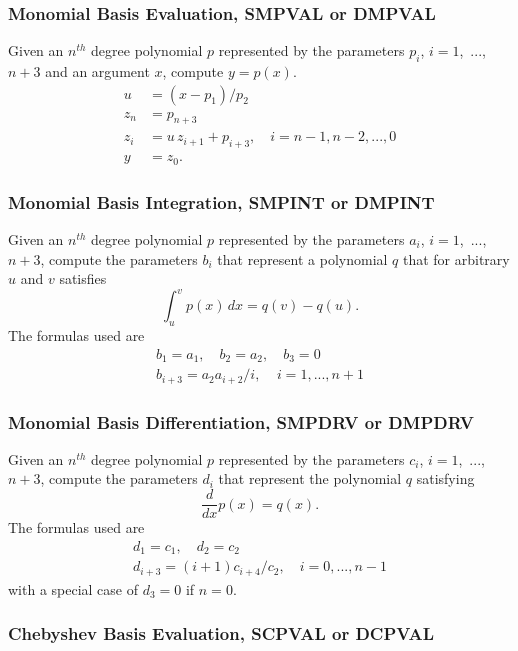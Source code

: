 \documentclass[twoside]{MATH77}
\begin{document}
\subsubsection{Monomial Basis Evaluation, SMPVAL or DMPVAL}

Given an $n^{th}$ degree polynomial $p$ represented by the parameters $p_i$,
$i=1$,\ ..., $n+3$ and an argument $x$, compute $y=p(x).$%
\begin{align*}
u&=(x-p_1)/p_2\\
z_n&=p_{n+3}\\
z_i&=u\,z_{i+1}+p_{i+3},\quad i=n-1,n-2,...,0\\
y&=z_0.
\end{align*}
\subsubsection{Monomial Basis Integration, SMPINT or DMPINT}

Given an $n^{th}$ degree polynomial $p$ represented by the parameters $a_i$,
$i=1$,\ ..., $n+3$, compute the parameters $b_i$ that represent a polynomial
$q$ that for arbitrary $u$ and $v$ satisfies%
\begin{equation*}
\int_u^vp(x)\,dx=q(v)-q(u).
\end{equation*}
The formulas used are%
\begin{gather*}
b_1=a_1,\quad b_2=a_2,\quad b_3=0\\
b_{i+3}=a_2a_{i+2}/i,\ \ \ \ \ i=1,...,n+1
\end{gather*}
\subsubsection{Monomial Basis Differentiation, SMPDRV or DMPDRV}

Given an $n^{th}$ degree polynomial $p$ represented by the parameters $c_i$,
$i=1$,\ ..., $n+3$, compute the parameters $d_i$ that represent the
polynomial $q$ satisfying%
\begin{equation*}
\frac d{dx}p(x)=q(x).
\end{equation*}
The formulas used are%
\begin{gather*}
d_1=c_1,\quad d_2=c_2\\
d_{i+3}=(i+1)c_{i+4}/c_2,\quad i=0,...,n-1
\end{gather*}
with a special case of $d_3=0$ if $n=0.$

\subsubsection{Chebyshev Basis Evaluation, SCPVAL or DCPVAL}
\end{document}
